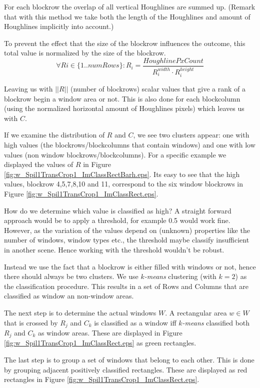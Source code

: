 For each blockrow the overlap of all vertical Houghlines are summed up.
(Remark that with this method we take both the length of the Houghlines and
amount of Houghlines implicitly into account.)

To prevent the effect that the size of the blockrow influences the outcome, this total value
is normalized by the size of the blockrow.
\[\forall Ri\in \{1..numRows\} : R_i = \frac{HoughlinePxCount}{R_i^{width} \cdot R_i^{height}}\]

Leaving us with $||R||$ (number of blockrows) scalar values that give a rank of a blockrow begin a window area or not.
This is also done for each blockcolumn (using the normalized horizontal amount of
Houghlines pixels) which leaves us with $C$.

If we examine the distribution of $R$ and $C$, we see two clusters appear: one with
high values (the blockrows/blockcolumns that contain windows) and one with low values (non window
blockrows/blockcolumns). For a specific example we displayed the values of $R$ in Figure \ref{fig:w_Spil1TransCrop1_ImClassRectBarh.eps}.
Its easy to see that the high values, blockrow 4,5,7,8,10 and 11, correspond to the
six window blockrows in Figure \ref{fig:w_Spil1TransCrop1_ImClassRect.eps}.

How do we determine which value is classified as high?  A straight forward
approach would be to apply a threshold, for example 0.5 would work fine.
However, as the variation of the values depend on (unknown) properties like the
number of windows, window types etc., the threshold maybe classify insufficient
in another scene.  Hence working with the threshold wouldn't be robust. 

Instead we use the fact that a blockrow is either filled with windows or not, hence
there should always be two clusters.  We use \emph{$k$-means} clustering (with
$k=2$) as the classification procedure.
This results in a set of Rows and Columns that are classified as window an
non-window areas.

The next step is to determine the actual windows $W$.
A rectangular area $w\in W$ that is crossed by $R_j$ and $C_k$ is classified as a
window iff \emph{$k$-means} classified both $R_j$ and $C_k$ as window areas. These are displayed in 
 Figure \ref{fig:w_Spil1TransCrop1_ImClassRect.eps} as green rectangles.

The last step is to group a set of windows that belong to each other. This is done by 
grouping adjacent positively classified rectangles. These are displayed as red
rectangles in Figure \ref{fig:w_Spil1TransCrop1_ImClassRect.eps}.

